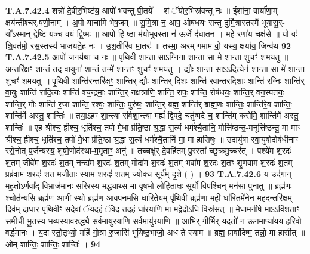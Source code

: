 \documentclass[17pt]{extarticle}
\begin{document}
{                  \newline
                                                                  \textbf{ T.A.7.42.4} \newline
                  शन्नो॑ दे॒वीर॒भिष्ट॑य॒ आपो॑ भवन्तु पी॒तये᳚ । शं ॅयोर॒भिस्र॑वन्तु नः ॥ ईशा॑ना॒ वार्या॑णा॒म् क्षय॑न्तीश्चर्.षणी॒नाम् । अ॒पो या॑चामि भेष॒जम् ॥ सु॒मि॒त्रा न॒ आप॒ ओष॑धयः सन्तु दुर्मि॒त्रास्तस्मै॑ भूयासु॒र्-यो᳚ऽस्मान्-द्वेष्टि॒ यञ्च॑ व॒यं द्वि॒ष्मः ॥  आपो॒ हि ष्ठा म॑यो॒भुव॒स्ता न॑ ऊ॒र्जे द॑धातन । म॒हे रणा॑य॒ चक्ष॑से ॥ यो वः॑ शि॒वत॑मो॒ रस॒स्तस्य॑ भाजयते॒ह नः॑ । उ॒श॒तीरि॑व मा॒तरः॑ ॥  तस्मा॒ अर॑म् गमाम वो॒ यस्य॒ क्षया॑य॒ जिन्व॑थ \textbf{ 92} \newline
                  \newline
                                                                  \textbf{ T.A.7.42.5} \newline
                  आपो॑ ज॒नय॑था च नः ॥  पृ॒थि॒वी शा॒न्ता साऽग्निना॑ शा॒न्ता सा मे॑ शा॒न्ता शुचꣳ॑ शमयतु ॥ अ॒न्तरि॑क्षꣳ शा॒न्तं तद् वा॒युना॑ शा॒न्तं तन्मे॑ शा॒न्तꣳ शुचꣳ॑ शमयतु ।  द्यौः शा॒न्ता साऽऽदि॒त्येन॑ शा॒न्ता सा मे॑ शा॒न्ता शुचꣳ॑ शमयतु ॥ पृ॒थि॒वी शान्ति॑र॒न्तरि॑क्षꣳ॒॒ शान्ति॒र् द्यौः शान्ति॒र् दिशः॒ शान्ति॑ रवान्तरदि॒शाः शान्ति॑ र॒ग्निः शान्ति॑र् वा॒युः शान्ति॑ रादि॒त्यः शान्ति॑  श्च॒न्द्रमाः॒ शान्ति॒र् नक्ष॑त्राणि॒ शान्ति॒ रापः॒ शान्ति॒ रोष॑धयः॒ शान्ति॒र् वन॒स्पत॑यः॒ शान्ति॒र् गौः शान्ति॑ र॒जा शान्ति॒ रश्वः॒ शान्तिः॒ पुरु॑षः॒ शान्ति॒र् ब्रह्म॒ शान्ति॑र् ब्राह्म॒णः शान्तिः॒ शान्ति॑रे॒व शान्तिः॒ शान्ति॑र्मे अस्तु॒ शान्तिः॑ ॥  तया॒ऽहꣳ शा॒न्त्या स॑र्वशा॒न्त्या मह्यं॑ द्वि॒पदे॒ चतु॑ष्पदे च॒ शान्ति॑म् करोमि॒ शान्ति॑र्मे अस्तु॒ शान्तिः॑ ॥  एह॒ श्रीश्च॒ ह्रीश्च॒ धृति॑श्च॒ तपो॑ मे॒धा प्र॑ति॒ष्ठा श्र॒द्धा स॒त्यं धर्म॑श्चै॒तानि॒ मोत्ति॑ष्ठन्त॒-मनूत्ति॑ष्ठन्तु॒ मा माꣳ॒॒ श्रीश्च॒ ह्रीश्च॒ धृति॑श्च॒ तपो॑ मे॒धा प्र॑ति॒ष्ठा श्र॒द्धा स॒त्यं धर्म॑श्चै॒तानि॑ मा॒ मा हा॑सिषुः ॥  उदायु॑षा स्वा॒युषोदोष॑धीनाꣳ॒॒ रसे॒नोत् प॒र्जन्य॑स्य॒ शुष्मे॒णोद॑स्था-म॒मृताꣳ॒॒ अनु॑ ॥ तच्चक्षु॑र् दे॒वहि॑तम् पु॒रस्ता᳚ च्छु॒क्रमु॒च्चर॑त् ।  पश्ये॑म श॒रदः॑ श॒तम् जीवे॑म श॒रदः॑ श॒तम् नन्दा॑म श॒रदः॑ श॒तम् मोदा॑म श॒रदः॑ श॒तम् भवा॑म श॒रदः॑ श॒तꣳ शृ॒णवा॑म श॒रदः॑ श॒तम् प्रब्र॑वाम श॒रदः॑ श॒त मजी॑ताः स्याम श॒रदः॑ श॒तम् ज्योक्च॒ सूर्य॑म् दृ॒शे ( ) । \textbf{ 93} \newline
                  \newline
                                                                  \textbf{ T.A.7.42.6} \newline
                  य उद॑गान् मह॒तोऽर्णवा᳚द्-वि॒भ्राज॑मानः सरि॒रस्य॒ मद्ध्या॒थ्स मा॑ वृष॒भो लो॑हिता॒क्षः सूर्यो॑ विप॒श्चिन् मन॑सा पुनातु ॥ ब्रह्म॑णः॒ श्चोत॑न्यसि॒ ब्रह्म॑ण आ॒णी स्थो॒ ब्रह्म॑ण आ॒वप॑नमसि धारि॒तेयम् पृ॑थि॒वी ब्रह्म॑णा म॒ही धा॑रि॒तमे॑नेन म॒हद॒न्तरि॑क्ष॒म् दिव॑म् दाधार पृथि॒वीꣳ सदे॑वां॒ ॅयद॒हं ॅवेद॒ तद॒हं धा॑रयाणि॒ मा मद्वेदोऽधि॒ विस्र॑सत् ॥ मे॒धा॒म॒नी॒षे माऽऽवि॑शताꣳ स॒मीची॑ भू॒तस्य॒ भव्य॒स्याव॑रुद्ध्यै॒ सर्व॒मायु॑रयाणि॒  सर्व॒मायु॑रयाणि ॥ आ॒भिर् गी॒र्भिर् यदतो॑ न ऊ॒नमाप्या॑यय हरिवो॒ वर्द्ध॑मानः ।  य॒दा स्तो॒तृभ्यो॒ महि॑ गो॒त्रा रु॒जासि॑ भूयिष्ठ॒भाजो॒ अध॑ ते स्याम ॥ ब्रह्म॒ प्रावा॑दिष्म॒ तन्नो॒ मा हा॑सीत् ॥ ओम् शान्तिः॒ शान्तिः॒ शान्तिः॑ । \textbf{ 94} \newline
}
\end{document}
